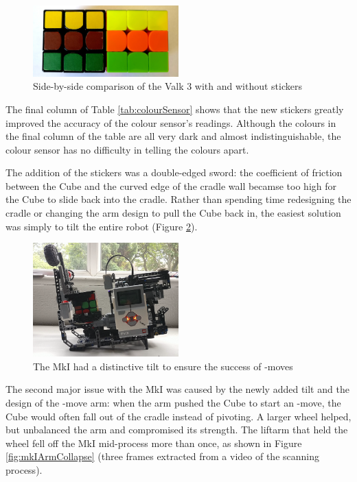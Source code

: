 \documentclass{report}
\newcommand{\move}[1]{\uppercase{\texttt{\formatmovesnospace{#1}}}-move}
\begin{document}
	\begin{figure}[h!]
		\centering
		\includegraphics[width=0.5\textwidth]{Resources/Images/imgCubeStickersComparison.jpg}
		\caption{Side-by-side comparison of the Valk 3 with and without stickers}
		\label{fig:imgCubeStickersComparison}
	\end{figure}

	The final column of Table \ref{tab:colourSensor} shows that the new stickers greatly improved the accuracy of the colour sensor's readings. Although the colours in the final column of the table are all very dark and almost indistinguishable, the colour sensor has no difficulty in telling the colours apart.
	
	The addition of the stickers was a double-edged sword: the coefficient of friction between the Cube and the curved edge of the cradle wall becamse too high for the Cube to slide back into the cradle. Rather than spending time redesigning the cradle or changing the arm design to pull the Cube back in, the easiest solution was simply to tilt the entire robot (Figure \ref{fig:imgCubeSolverV1}).
	
	\begin{figure}[H]
		\centering
		\includegraphics[width=0.5\textwidth]{Resources/Images/imgCubeSolverV1.png}
		\caption{The MkI had a distinctive tilt to ensure the success of \move{x}s}
		\label{fig:imgCubeSolverV1}
	\end{figure}

	The second major issue with the MkI was caused by the newly added tilt and the design of the \move{x} arm: when the arm pushed the Cube to start an \move{x}, the Cube would often fall out of the cradle instead of pivoting. A larger wheel helped, but unbalanced the arm and compromised its strength. The liftarm that held the wheel fell off the MkI mid-process more than once, as shown in Figure \ref{fig:mkIArmCollapse} (three frames extracted from a video of the scanning process).
\end{document}
